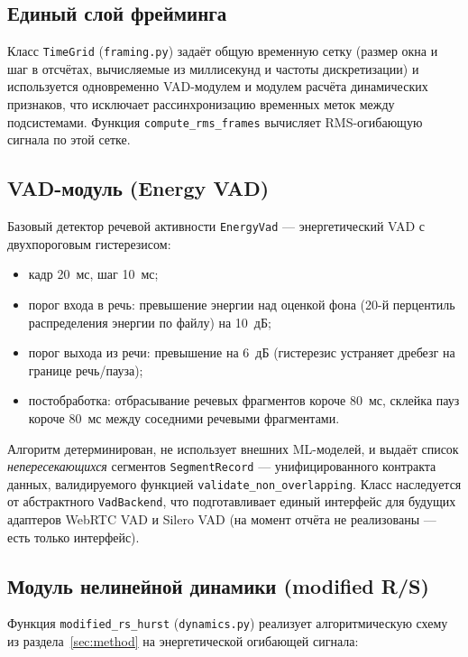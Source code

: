 \documentclass[12pt,a4paper]{article}
\begin{document}
\subsection{Единый слой фрейминга}

Класс \texttt{TimeGrid} (\texttt{framing.py}) задаёт общую временную сетку
(размер окна и шаг в отсчётах, вычисляемые из миллисекунд и частоты
дискретизации) и используется одновременно VAD-модулем и модулем расчёта
динамических признаков, что исключает рассинхронизацию временных меток между
подсистемами. Функция \texttt{compute\_rms\_frames} вычисляет RMS-огибающую
сигнала по этой сетке.

\subsection{VAD-модуль (Energy VAD)}

Базовый детектор речевой активности \texttt{EnergyVad} — энергетический VAD
с двухпороговым гистерезисом:

\begin{itemize}
  \item кадр 20~мс, шаг 10~мс;
  \item порог входа в речь: превышение энергии над оценкой фона (20-й
   перцентиль распределения энергии по файлу) на 10~дБ;
  \item порог выхода из речи: превышение на 6~дБ (гистерезис устраняет
   дребезг на границе речь/пауза);
  \item постобработка: отбрасывание речевых фрагментов короче 80~мс,
   склейка пауз короче 80~мс между соседними речевыми фрагментами.
\end{itemize}

Алгоритм детерминирован, не использует внешних ML-моделей, и выдаёт список
\emph{непересекающихся} сегментов \texttt{SegmentRecord} — унифицированного
контракта данных, валидируемого функцией
\texttt{validate\_non\_overlapping}. Класс наследуется от абстрактного
\texttt{VadBackend}, что подготавливает единый интерфейс для будущих
адаптеров WebRTC VAD и Silero VAD (на момент отчёта не реализованы — есть
только интерфейс).

\subsection{Модуль нелинейной динамики (modified R/S)}

Функция \texttt{modified\_rs\_hurst} (\texttt{dynamics.py}) реализует
алгоритмическую схему из раздела~\ref{sec:method} на энергетической
огибающей сигнала:
\end{document}
